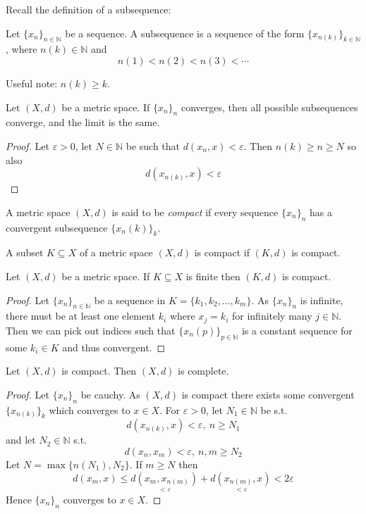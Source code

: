 Recall the definition of a subsequence: 
\begin{defn}[Subsequence]
    Let $\{x_n\}_{n\in \mathbb N}$ be a sequence. A subsequence is 
    a sequence of the form $\{x_{n(k)}\}_{k\in\mathbb N}$, 
    where $n(k) \in \mathbb N$ and 
    \[
        n(1) < n(2) < n(3) < \cdots
    \]
\end{defn}
Useful note: $n(k) \geq k$.
\begin{prop}
    Let $(X,d)$ be a metric space. If $\{x_n\}_n$ converges, then 
    all possible subsequences converge, and the limit is the 
    same. 
\end{prop}
\begin{proof}
    Let $\varepsilon > 0$, let $N \in \mathbb N$ be such that 
    $d(x_n, x) < \varepsilon$. Then $n(k) \geq n \geq N$
    so also 
    \[
        d(x_{n(k)}, x) < \varepsilon
    \]
\end{proof}
\begin{defn}[Compactness]
    A metric space $(X,d)$ is said to be \emph{compact} if every 
    sequence $\{x_n\}_n$ has a convergent subsequence 
    $\{x_n(k)\}_k$.
\end{defn}
\begin{defn}
    A subset $K \subseteq X$ of a metric space $(X,d)$ 
    is compact if $(K,d)$ is compact. 
\end{defn}
\begin{thm}
    Let $(X,d)$ be a metric space. If $K \subseteq X$ is finite 
    then $(K,d)$ is compact.
\end{thm}
\begin{proof}
    Let $\{x_n\}_{n\in\mathbb N}$ be a sequence in 
    $K = \{k_1, k_2, \ldots, k_m\}$. 
    As $\{x_n\}_n$ is infinite, there must be at least one 
    element $k_i$ where $x_j = k_i$ for infinitely many 
    $j \in \mathbb N$. 
    Then we can pick out indices such that 
    $\{x_n(p)\}_{p\in\mathbb N}$ is a constant sequence for 
    some $k_i \in K$ and thus convergent.
\end{proof}
\begin{thm}
    Let $(X,d)$ is compact. Then $(X,d)$ is complete. 
\end{thm}
\begin{proof}
    Let $\{x_n\}_n$ be cauchy. As $(X,d)$ is compact there exists 
    some convergent $\{x_{n(k)}\}_k$ which converges to $x \in X$.  
    For $\varepsilon > 0$, let $N_1 \in \mathbb N$ be s.t. 
    \[
        d(x_{n(k)}, x) < \varepsilon, \: n \geq N_1
    \]
    and let $N_2 \in \mathbb N$ s.t. 
    \[
        d(x_n, x_m) < \varepsilon, \: n,m \geq N_2
    \]
    Let $N = \max\{n(N_1),N_2\}$. If $m \geq N$ then 
    \[
        d(x_m, x) \leq \underset{<\varepsilon}{d(x_m, x_{n(m)})}  
        + \underset{<\varepsilon}{d(x_{n(m)}, x)} < 
        2\varepsilon
    \]
    Hence $\{x_n\}_n$ converges to $x \in X$.
\end{proof}
